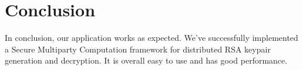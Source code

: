 {\let\clearpage\relax \chapter{Conclusion}}

In conclusion, our application works as expected. We’ve successfully implemented a Secure  Multiparty Computation framework for distributed RSA keypair generation and decryption. It is overall easy to use and has good performance.
